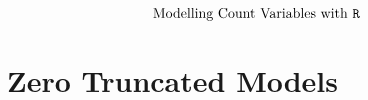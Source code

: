 \documentclass{beamer}
\begin{document}
\begin{frame}
	
	\huge
	\[ \mbox{Modelling Count Variables with \texttt{R} } \]
	\end{frame}



\section{Zero Truncated Models}




\end{document}
